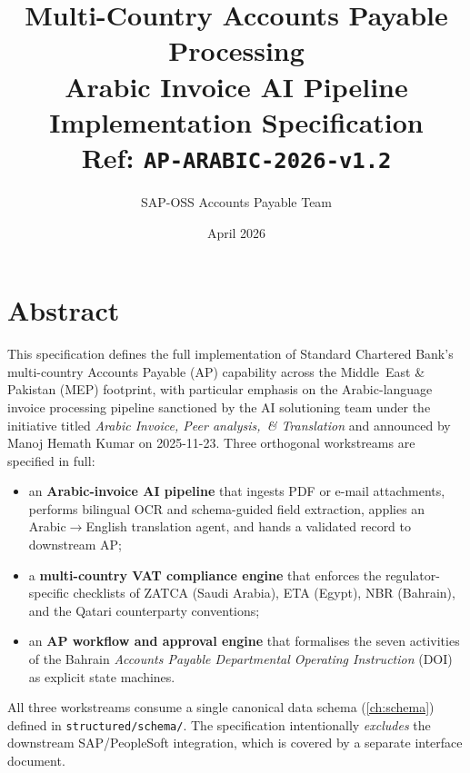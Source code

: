 \documentclass[11pt,a4paper,twoside]{report}
\newcommand{\corpus}{}
\begin{document}
\title{\vspace{-2em}\Large Multi-Country Accounts Payable Processing \\
\textbf{Arabic Invoice AI Pipeline} \\
\large Implementation Specification \\
\small Ref: \texttt{AP-ARABIC-2026-v1.2}}
\author{SAP-OSS Accounts Payable Team}
\date{April 2026}

\maketitle

\chapter*{Abstract}

This specification defines the full implementation of Standard Chartered
Bank's multi-country Accounts Payable (AP) capability across the
Middle~East \& Pakistan (MEP) footprint, with particular emphasis on the
Arabic-language invoice processing pipeline sanctioned by the AI solutioning
team under the initiative titled \emph{Arabic Invoice, Peer analysis,~\& Translation}
and announced by Manoj Hemath Kumar on 2025-11-23. Three orthogonal
workstreams are specified in full:

\begin{itemize}
  \item an \textbf{Arabic-invoice AI pipeline} that ingests PDF or e-mail
        attachments, performs bilingual OCR and schema-guided field
        extraction, applies an Arabic$\to$English translation agent,
        and hands a validated record to downstream AP;
  \item a \textbf{multi-country VAT compliance engine} that enforces the
        regulator-specific checklists of ZATCA (Saudi Arabia), ETA
        (Egypt), NBR (Bahrain), and the Qatari counterparty conventions;
  \item an \textbf{AP workflow and approval engine} that formalises the
        seven activities of the Bahrain \emph{Accounts Payable Departmental
        Operating Instruction} (DOI) as explicit state machines.
\end{itemize}

All three workstreams consume a single canonical data schema
(\cref{ch:schema}) defined in \corpus\texttt{structured/schema/}. The
specification intentionally \emph{excludes} the downstream SAP/PeopleSoft
integration, which is covered by a separate interface document.
\end{document}
